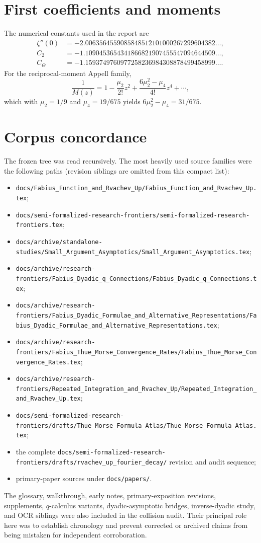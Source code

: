 \documentclass[11pt]{article}
\numberwithin{equation}{section}
\theoremstyle{definition}
\theoremstyle{remark}
\begin{document}
\section{First coefficients and moments}
\label{p2:app:coefficients}

The numerical constants used in the report are
\begin{align*}
 \zeta''(0)&=-2.0063564559085848512101000267299604382\ldots,\\
 C_2&=-1.1090453654341866821907455547094644509\ldots,\\
 C_{\Theta}&=-1.1593749760977258236984308878499458999\ldots.
\end{align*}
For the reciprocal-moment Appell family,
\[
 \frac1{M(z)}=1-\frac{\mu_2}{2!}z^2
 +\frac{6\mu_2^2-\mu_4}{4!}z^4+\cdots,
\]
which with $\mu_2=1/9$ and $\mu_4=19/675$ yields
$6\mu_2^2-\mu_4=31/675$.

\section{Corpus concordance}
\label{p2:app:corpus}

The frozen tree was read recursively.  The most heavily used source families
were the following paths (revision siblings are omitted from this compact list):
\begin{itemize}
\item \nolinkurl{docs/Fabius_Function_and_Rvachev_Up/Fabius_Function_and_Rvachev_Up.tex};
\item \nolinkurl{docs/semi-formalized-research-frontiers/semi-formalized-research-frontiers.tex};
\item \nolinkurl{docs/archive/standalone-studies/Small_Argument_Asymptotics/Small_Argument_Asymptotics.tex};
\item \nolinkurl{docs/archive/research-frontiers/Fabius_Dyadic_q_Connections/Fabius_Dyadic_q_Connections.tex};
\item \nolinkurl{docs/archive/research-frontiers/Fabius_Dyadic_Formulae_and_Alternative_Representations/Fabius_Dyadic_Formulae_and_Alternative_Representations.tex};
\item \nolinkurl{docs/archive/research-frontiers/Fabius_Thue_Morse_Convergence_Rates/Fabius_Thue_Morse_Convergence_Rates.tex};
\item \nolinkurl{docs/archive/research-frontiers/Repeated_Integration_and_Rvachev_Up/Repeated_Integration_and_Rvachev_Up.tex};
\item \nolinkurl{docs/semi-formalized-research-frontiers/drafts/Thue_Morse_Formula_Atlas/Thue_Morse_Formula_Atlas.tex};
\item the complete \nolinkurl{docs/semi-formalized-research-frontiers/drafts/rvachev_up_fourier_decay/} revision and audit sequence;
\item primary-paper sources under \nolinkurl{docs/papers/}.
\end{itemize}
The glossary, walkthrough, early notes, primary-exposition revisions, supplements,
$q$-calculus variants, dyadic-asymptotic bridges, inverse-dyadic study, and OCR
siblings were also included in the collision audit.  Their principal role here
was to establish chronology and prevent corrected or archived claims from being
mistaken for independent corroboration.
\end{document}
